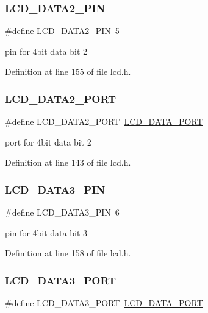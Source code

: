 \subsubsection{\texorpdfstring{LCD\_DATA2\_PIN}{LCD\_DATA2\_PIN}}
{\footnotesize\ttfamily \#define L\+C\+D\+\_\+\+D\+A\+T\+A2\+\_\+\+P\+IN~5}

pin for 4bit data bit 2 

Definition at line 155 of file lcd.\+h.

\mbox{\label{group__pfleury__lcd_ga4d5c48a3f2b9426c14bbca3150834a20}} 
\subsubsection{\texorpdfstring{LCD\_DATA2\_PORT}{LCD\_DATA2\_PORT}}
{\footnotesize\ttfamily \#define L\+C\+D\+\_\+\+D\+A\+T\+A2\+\_\+\+P\+O\+RT~\mbox{\hyperlink{group__pfleury__lcd_ga077def6ebb43bf9aee4e7cad468ed726}{L\+C\+D\+\_\+\+D\+A\+T\+A\+\_\+\+P\+O\+RT}}}

port for 4bit data bit 2 

Definition at line 143 of file lcd.\+h.

\mbox{\label{group__pfleury__lcd_ga54032ce0050853e181f879b69fec4370}} 
\subsubsection{\texorpdfstring{LCD\_DATA3\_PIN}{LCD\_DATA3\_PIN}}
{\footnotesize\ttfamily \#define L\+C\+D\+\_\+\+D\+A\+T\+A3\+\_\+\+P\+IN~6}

pin for 4bit data bit 3 

Definition at line 158 of file lcd.\+h.

\mbox{\label{group__pfleury__lcd_gaec71b6692f2af7c9de32dbe85fcb51c2}} 
\subsubsection{\texorpdfstring{LCD\_DATA3\_PORT}{LCD\_DATA3\_PORT}}
{\footnotesize\ttfamily \#define L\+C\+D\+\_\+\+D\+A\+T\+A3\+\_\+\+P\+O\+RT~\mbox{\hyperlink{group__pfleury__lcd_ga077def6ebb43bf9aee4e7cad468ed726}{L\+C\+D\+\_\+\+D\+A\+T\+A\+\_\+\+P\+O\+RT}}}


